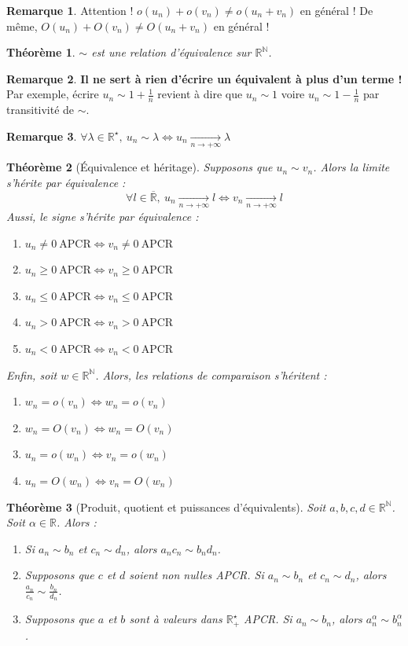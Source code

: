 \documentclass[french]{book}
\newcommand{\N}{\mathbb{N}}
\newcommand{\R}{\mathbb{R}}
\newcommand{\st}{^\star}
\theoremstyle{plain}
\newtheorem{thm}{Théorème}[chapter]
\theoremstyle{definition}
\newtheorem{rmq}{Remarque}[chapter]
\theoremstyle{remark}
\begin{document}
\begin{rmq}
	Attention ! $o(u_n)+o(v_n)\ne o(u_n+v_n)$ en général ! De même, $O(u_n)+O(v_n)\ne O(u_n+v_n)$ en général !
\end{rmq}
\begin{thm}
	$\sim$ est une relation d'équivalence sur $\R^\N$.
\end{thm}
\begin{rmq}
	\textbf{Il ne sert à rien d'écrire un équivalent à plus d'un terme !} Par exemple, écrire $u_n\sim 1+\displaystyle\frac1n$ revient à dire que $u_n\sim 1$ voire $u_n\sim 1-\displaystyle\frac1n$ par transitivité de $\sim$.
\end{rmq}
\begin{rmq}
	$\forall \lambda\in\R\st,\ u_n\sim\lambda \Longleftrightarrow u_n\xrightarrow[n\to+\infty]{}\lambda$
\end{rmq}
\begin{thm}[Équivalence et héritage]
	Supposons que $u_n\sim v_n$. Alors la limite s'hérite par équivalence : $$\forall l\in\overline{\R},\ u_n\xrightarrow[n\to+\infty]{}l \Longleftrightarrow v_n\xrightarrow[n\to+\infty]{}l$$ Aussi, le signe s'hérite par équivalence : \begin{enumerate}
		\item $u_n\ne0 \ \text{APCR} \Longleftrightarrow v_n\ne0 \ \text{APCR}$
		\item $u_n\geqslant0 \ \text{APCR} \Longleftrightarrow v_n\geqslant0 \ \text{APCR}$
		\item $u_n\leqslant0 \ \text{APCR} \Longleftrightarrow v_n\leqslant0 \ \text{APCR}$
		\item $u_n>0 \ \text{APCR} \Longleftrightarrow v_n>0 \ \text{APCR}$
		\item $u_n<0 \ \text{APCR} \Longleftrightarrow v_n<0 \ \text{APCR}$
	\end{enumerate}
	Enfin, soit $w\in\R^\N$. Alors, les relations de comparaison s'héritent :
	\begin{enumerate}
		\item $w_n=o(v_n)\Longleftrightarrow w_n=o(v_n)$
		\item $w_n=O(v_n)\Longleftrightarrow w_n=O(v_n)$
		\item $u_n=o(w_n)\Longleftrightarrow v_n=o(w_n)$
		\item $u_n=O(w_n)\Longleftrightarrow v_n=O(w_n)$
	\end{enumerate}
\end{thm}
\begin{thm}[Produit, quotient et puissances d'équivalents]
	Soit $a,b,c,d\in\R^\N$. Soit $\alpha\in\R$. Alors :
	\begin{enumerate}
		\item Si $a_n\sim b_n$ et $c_n\sim d_n$, alors $a_n c_n\sim b_n d_n$.
		\item Supposons que $c$ et $d$ soient non nulles APCR. Si $a_n\sim b_n$ et $c_n\sim d_n$, alors $\displaystyle\frac{a_n}{c_n}\sim \frac{b_n}{d_n}$.
		\item Supposons que $a$ et $b$ sont à valeurs dans $\R_+\st$ APCR. Si $a_n\sim b_n$, alors $a_n^\alpha\sim b_n^\alpha$.
	\end{enumerate}
\end{thm}
\end{document}
